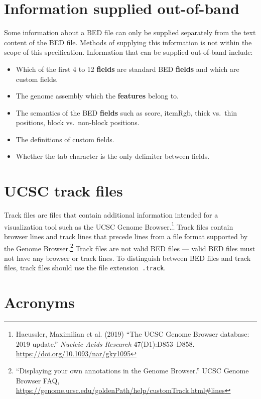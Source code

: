 \documentclass[11pt]{article}
\begin{document}
\section{Information supplied out-of-band}

Some information about a \ac{BED} file can only be supplied separately from the text content of the \ac{BED} file.
Methods of supplying this information is not within the scope of this specification.
Information that can be supplied out-of-band include:

\begin{itemize}
    \item Which of the first 4 to 12 \textbf{fields} are standard \ac{BED} \textbf{fields} and which are custom fields.
    \item The genome assembly which the \textbf{features} belong to.
    \item The semantics of the \ac{BED} \textbf{fields} such as \textsf{score}, \textsf{itemRgb}, thick vs.~thin positions, block vs.~non-block positions.
    \item The definitions of custom fields.
    \item Whether the tab character is the only delimiter between fields.
\end{itemize}

\section{\acs{UCSC} track files}

Track files are files that contain additional information intended for a visualization tool such as the \ac{UCSC} Genome Browser.\footnote{Haeussler, Maximilian et al.
  (2019) ``The \acl{UCSC} Genome Browser database: 2019 update.''
  \emph{Nucleic Acids Research} 47(D1):D853--D858.
  \url{https://doi.org/10.1093/nar/gky1095}}
Track files contain browser lines and track lines that precede lines from a file format supported by the Genome Browser.\footnote{``Displaying your own annotations in the Genome Browser.'' \ac{UCSC} Genome Browser FAQ, \url{https://genome.ucsc.edu/goldenPath/help/customTrack.html\#lines}}
Track files are not valid \ac{BED} files --- valid \ac{BED} files must not have any browser or track lines.
To distinguish between \ac{BED} files and track files, track files should use the file extension~\texttt{.track}.

\section{Acronyms}
\end{document}
